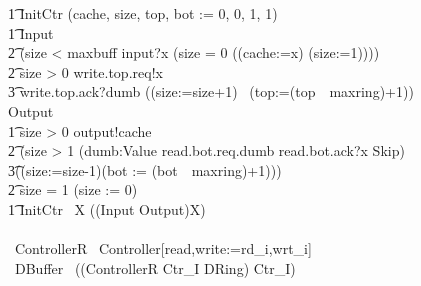 \documentclass[10pt]{article}
\begin{document}
\begin{circus}
\t1 InitCtr \circdef (cache, size, top, bot := 0, 0, 1, 1) \\
\t1 Input \circdef \\
\t2 (\lcircguard size < maxbuff \rcircguard \circguard input?x \then (\lcircguard size = 0 \rcircguard \circguard ((cache:=x) \circseq (size:=1))))\\
\t2 \extchoice \lcircguard size > 0 \rcircguard \circguard write.top.req!x \then \\
\t3 write.top.ack?dumb \then ((size:=size+1) \circseq\ (top:=(top~\mod~maxring)+1))
    \\
 Output \circdef \\
 \t1 \lcircguard size > 0 \rcircguard \circguard output!cache \then\\
 \t2 (\lcircguard size > 1 \rcircguard \circguard (\Intchoice dumb:Value \circspot read.bot.req.dumb \then read.bot.ack?x \then Skip) \circseq \\
 \t3((size:=size-1)\circseq (bot := (bot~\mod~maxring)+1)))\\
 \t2 \extchoice \lcircguard size = 1 \rcircguard \circguard (size := 0) \\
\t1 \circspot InitCtr \circseq\ \circmu X \circspot ((Input \extchoice Output)\circseq X)
\\
\circend
\\
\circprocess\ ControllerR \circdef\ Controller[read,write:=rd\_i,wrt\_i]
\\
\circprocess\ DBuffer \circdef\ ((ControllerR \lpar Ctr\_I \rpar DRing) \circhide Ctr\_I)
\end{circus}%
\end{document}
